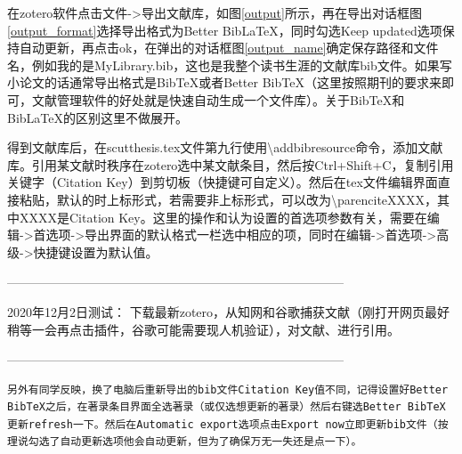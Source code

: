 在zotero软件点击文件->导出文献库，如图\ref{output}所示，再在导出对话框图\ref{output_format}选择导出格式为Better BibLaTeX，同时勾选Keep updated选项保持自动更新，再点击ok，在弹出的对话框图\ref{output_name}确定保存路径和文件名，例如我的是MyLibrary.bib，这也是我整个读书生涯的文献库bib文件。如果写小论文的话通常导出格式是BibTeX或者Better BibTeX（这里按照期刊的要求来即可，文献管理软件的好处就是快速自动生成一个文件库）。关于BibTeX和BibLaTeX的区别这里不做展开。

得到文献库后，在scutthesis.tex文件第九行使用\textbackslash{}addbibresource命令，添加文献库。引用某文献时秩序在zotero选中某文献条目，然后按Ctrl+Shift+C，复制引用关键字（Citation Key）到剪切板（快捷键可自定义）。然后在tex文件编辑界面直接粘贴，默认的时上标形式，若需要非上标形式，可以改为\textbackslash{}parencite{XXXX}，其中XXXX是Citation Key。这里的操作和认为设置的首选项参数有关，需要在编辑->首选项->导出界面的默认格式一栏选中相应的项，同时在编辑->首选项->高级->快捷键设置为默认值。

---------------------------------------------------------------------------------

2020年12月2日测试：
下载最新zotero，从知网和谷歌捕获文献（刚打开网页最好稍等一会再点击插件，谷歌可能需要现人机验证），对文献\parencite{Renduchintala_2019}、\parencite{Meng_2020}进行引用。

---------------------------------------------------------------------------------
\begin{lstlisting}
另外有同学反映，换了电脑后重新导出的bib文件Citation Key值不同，记得设置好Better BibTeX之后，在著录条目界面全选著录（或仅选想更新的著录）然后右键选Better BibTeX更新refresh一下。然后在Automatic export选项点击Export now立即更新bib文件（按理说勾选了自动更新选项他会自动更新，但为了确保万无一失还是点一下）。
\end{lstlisting}










